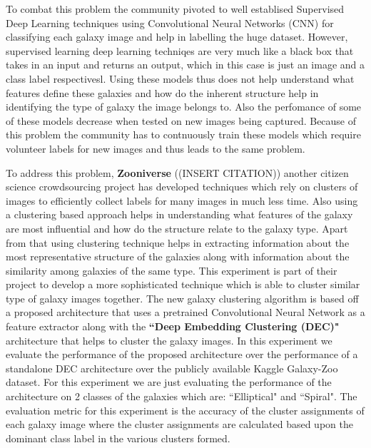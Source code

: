 \documentclass{article}
\begin{document}
To combat this problem the community pivoted to well establised Supervised Deep Learning techniques using Convolutional Neural Networks (CNN) for classifying each galaxy image and help in labelling the huge dataset. However, supervised learning deep learning techniqes are very much like a black box that takes in an input and returns an output, which in this case is just an image and a class label respectivesl. Using these models thus does not help understand what features define these galaxies and how do the inherent structure help in identifying the type of galaxy the image belongs to.  Also the perfomance of some of these models   decrease when tested on new images being captured. Because of this problem the community has to contnuously train these models which require volunteer labels for new images and thus leads to the same problem. 

To address this problem, \textbf{Zooniverse} ((INSERT CITATION)) another citizen science crowdsourcing project has developed techniques which rely on clusters of images to efficiently collect labels for many images in much less time. Also using a clustering based approach helps in understanding what features of the galaxy are most influential and how do the structure relate to the galaxy type. Apart from that using clustering technique helps in extracting information about the most representative structure of the galaxies along with information about the similarity among galaxies of the same type. This experiment is part of their project to develop a more sophisticated technique which is able to cluster similar type of galaxy images together. The new galaxy clustering algorithm is based off a proposed architecture that uses a pretrained Convolutional Neural Network as a feature extractor along with the \textbf{``Deep Embedding Clustering (DEC)"} architecture that helps to cluster the galaxy images. In this experiment we evaluate the performance of the proposed architecture over the performance of a standalone DEC architecture over the publicly available Kaggle Galaxy-Zoo dataset. For this experiment we are just evaluating the performance of the architecture on 2 classes of the galaxies which are: ``Elliptical" and ``Spiral". The evaluation metric for this experiment is the accuracy of the cluster assignments of each galaxy image where the cluster assignments are calculated based upon the dominant class label in the various clusters formed. 
\end{document}
